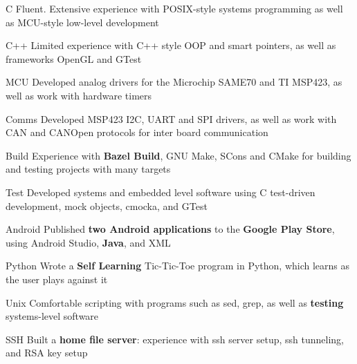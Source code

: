 \begin{cvskills}

 \cvskill
    {C} %
    {Fluent. Extensive experience with POSIX-style systems programming as well as MCU-style low-level development}%

 \cvskill
    {C++} %
    {Limited experience with C++ style OOP and smart pointers, as well as frameworks OpenGL and GTest}%

 \cvskill
    {MCU} %
    {Developed analog drivers for the Microchip SAME70 and TI MSP423, as well as work with hardware timers   } %

 \cvskill
    {Comms} %
    {Developed MSP423 I2C, UART and SPI drivers, as well as work with CAN and CANOpen protocols for inter board communication}


 \cvskill
    {Build} %
    {Experience with \textbf{Bazel Build}, GNU Make, SCons and CMake for building and testing projects with many targets} %

 \cvskill
    {Test} %
    {Developed systems and embedded level software using C test-driven development, mock objects, cmocka, and GTest} %
    
 \cvskill
    {Android} %
    {Published \textbf{two Android applications} to the \textbf{Google Play Store}, using Android Studio, \textbf{Java}, and XML} %

 
 \cvskill
    {Python} %
    {Wrote a \textbf{Self Learning} Tic-Tic-Toe program in Python, which learns as the user plays against it} 


 \cvskill
    {Unix} %
    {Comfortable scripting with programs such as sed, grep, as well as \textbf{testing} systems-level software} %

 \cvskill
    {SSH} %
    {Built a \textbf{home file server}: experience with ssh server setup, ssh tunneling, and RSA key setup} %



\end{cvskills}

